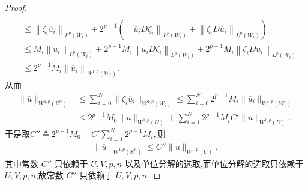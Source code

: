 \documentclass[../../main.tex]{subfiles}
\begin{document}
\begin{proof}
\begin{align*}
\\
&\leqslant \left\| \zeta _i\overline{u}_i \right\| _{L^p\left( W_i \right)}+2^{p-1}\left( \left\| \overline{u}_iD\zeta _i \right\| _{L^p\left( W_i \right)}+\left\| \zeta _iD\overline{u}_i \right\| _{L^p\left( W_i \right)} \right) 
\\
&\leqslant M_i\left\| \overline{u}_i \right\| _{L^p\left( W_i \right)}+2^{p-1}M_i\left\| \overline{u}_iD\zeta _i \right\| _{L^p\left( W_i \right)}+2^{p-1}M_i\left\| \zeta _iD\overline{u}_i \right\| _{L^p\left( W_i \right)}
\\
&\leqslant 2^{p-1}M_i\left\| \overline{u}_i \right\| _{W^{1,p}\left( W_i \right)}.
\end{align*}
从而
\begin{align*}
\parallel \overline{u}\parallel _{W^{1,p}(\mathbb{R} ^n)}&\leqslant \sum_{i=0}^N{\parallel \zeta _i\overline{u}_i}\parallel _{W^{1,p}(W_i)}\leqslant \sum_{i=0}^N{2^{p-1}M_i\parallel \overline{u}_i\parallel _{W^{1,p}(W_i)}}
\\
&\leqslant 2^{p-1}M_0\parallel u\parallel _{W^{1,p}(U)}+\sum_{i=1}^N{2^{p-1}M_iC'}\parallel u\parallel _{W^{1,p}(U)}.
\end{align*}
于是取$C'' \triangleq 2^{p-1}M_0+C' \sum_{i=1}^N{2^{p-1}M_i},$则
\begin{align*}
\|\overline{u}\|_{W^{1,p}(\mathbb{R}^n)}\leqslant C''\|u\|_{W^{1,p}(U)},
\end{align*}
其中常数 \(C''\) 只依赖于 \(U,V,p,n\) 以及单位分解的选取,而单位分解的选取只依赖于\(U,V,p,n\),故常数 \(C''\) 只依赖于 \(U,V,p,n\).


\end{proof}
\end{document}
